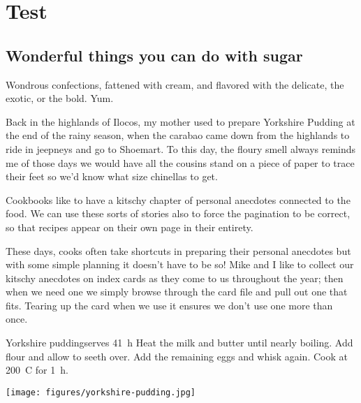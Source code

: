 \chapter{Test}
\label{ch:Test}

\section{Wonderful things you can do with sugar}
  Wondrous confections, fattened with cream, and flavored with the delicate, the exotic, or the bold.  Yum.

Back in the highlands of Ilocos, my mother used to prepare Yorkshire Pudding at the end of the rainy season, when the carabao came down from the highlands to ride in jeepneys and go to Shoemart.  To this day, the floury smell always reminds me of those days we would have all the cousins stand on a piece of paper to trace their feet so we'd know what size chinellas to get. 

Cookbooks like to have a kitschy chapter of personal anecdotes connected to the food.  We can use these sorts of stories also to force the pagination to be correct, so that recipes appear on their own page in their entirety.

These days, cooks often take shortcuts in preparing their personal anecdotes but with some simple planning it doesn't have to be so!  Mike and I like to collect our kitschy anecdotes on index cards as they come to us throughout the year; then when we need one we simply browse through the card file and pull out one that fits.  Tearing up the card when we use it ensures we don't use one more than once. 
\vfill

\clearpage
\begin{recipe}{Yorkshire pudding}{serves 4}{\SI{1}{\hour}}
Heat the milk and butter until nearly boiling.  Add flour and allow to seeth over.
Add the remaining eggs and whisk again.  Cook at \SI{200}{C} for \SI{1}{\hour}.
\end{recipe}
\begin{figure*}[h!]
\centering
\texttt{[image: figures/yorkshire-pudding.jpg]}
\caption{The mark of a good Ilocano Yorkshire pudding is that it is puffy.}
\end{figure*}


